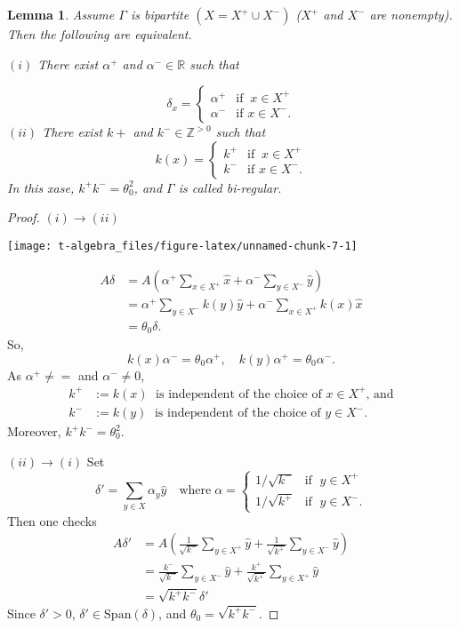 \documentclass[
]{book}
\newtheorem{lemma}{Lemma}[chapter]
\theoremstyle{definition}
\theoremstyle{definition}
\theoremstyle{definition}
\theoremstyle{definition}
\theoremstyle{remark}
\begin{document}
\begin{lemma}
\protect\hypertarget{lem:baiparite-principal}{}\label{lem:baiparite-principal}Assume \(\Gamma\) is bipartite \((X = X^+ \cup X^-)\) (\(X^+\) and \(X^-\) are nonempty). Then the following are equivalent.

\((i)\) There exist \(\alpha^+\) and \(\alpha^-\in \mathbb{R}\) such that

\[\delta_x = \begin{cases} \alpha^+ & \text{if }\: x\in X^+\\
\alpha^- & \text{if } x\in X^-.
\end{cases}\]
\textbar{} \((ii)\) There exist \(k+\) and \(k^-\in \mathbb{Z}^{>0}\) such that
\[k(x) = \begin{cases} k^+ & \text{if }\: x\in X^+\\
k^- & \text{if } x\in X^-.
\end{cases}\]
In this xase, \(k^+k^- = \theta_0^2\), and \(\Gamma\) is called bi-regular.
\end{lemma}

\begin{proof}
\((i)\to(ii)\)

\begin{center}\texttt{[image: t-algebra\_files/figure-latex/unnamed-chunk-7-1]} \end{center}

\begin{align}
A\delta & = A\left(\alpha^+\sum_{x\in X^+}\hat{x} + \alpha^-\sum_{y\in X^-}\hat{y}\right)\\
& = \alpha^+\sum_{y\in X^-}k(y)\hat{y} + \alpha^-\sum_{x\in X^+}k(x)\hat{x}\\
& = \theta_0\delta.
\end{align}
So,
\[k(x)\alpha^- = \theta_0\alpha^+, \quad k(y)\alpha^+ = \theta_0\alpha^-.\]
As \(\alpha^+\neq =\) and \(\alpha^- \neq 0\),
\begin{align}
k^+ & := k(x) \; \text{ is independent of the choice of $x\in X^+$, and}\\
k^- & := k(y) \; \text{ is independent of the choice of $y\in X^-$.}
\end{align}
Moreover, \(k^+k^- = \theta_0^2\).

\((ii)\to(i)\)
Set
\[\delta' = \sum_{y\in X}\alpha_y\hat{y} \quad \text{where}\; \alpha = \begin{cases} 1/\sqrt{k^-} & \text{if }\; y\in X^+\\ 1/\sqrt{k^+} & \text{if }\; y\in X^-.\end{cases}\]
Then one checks
\begin{align}
A\delta' & = A\left(\frac{1}{\sqrt{k^-}}\sum_{y\in X^+}\hat{y} + \frac{1}{\sqrt{k^+}}\sum_{y\in X^-}\hat{y}\right)\\
& =  \frac{k^-}{\sqrt{k^-}}\sum_{y\in X^-}\hat{y} + \frac{k^+}{\sqrt{k^+}}\sum_{y\in X^+}\hat{y}\\
& = \sqrt{k^+k^-}\delta'
\end{align}
Since \(\delta' >0\), \(\delta'\in \mathrm{Span}(\delta)\), and \(\theta_0 = \sqrt{k^+k^-}\).
\end{proof}
\end{document}
